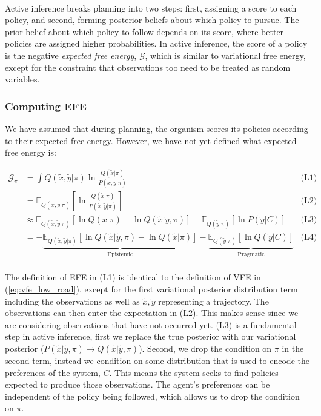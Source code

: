 \documentclass{article}
\newcommand{\refp}[1]{(\ref{#1})}
\begin{document}
\

Active inference breaks planning into two steps: first, assigning a score to each policy, and second, forming posterior beliefs about which policy to pursue. The prior belief about which policy to follow depends on its score, where better policies are assigned higher probabilities. In active inference, the score of a policy is the negative \textit{expected free energy}, $\mathcal{G}$, which is similar to variational free energy, except for the constraint that observations too need to be treated as random variables.

\subsubsection{Computing EFE}

We have assumed that during planning, the organism scores its policies according to their expected free energy. However, we have not yet defined what expected free energy is:

\begin{equation}\label{eq:efe}
	\begin{aligned}
		\mathcal{G}_\pi &= \int Q(\tilde{x}, \tilde{y} | \pi) \ln \frac{Q(\tilde{x} | \pi)}{P(\tilde{x}, \tilde{y} | \pi)} & \text{(L1)}\\ 
		&= \mathbb{E}_{Q(\tilde{x}, \tilde{y} | \pi)} \left[ \ln \frac{Q(\tilde{x} | \pi)}{P(\tilde{x}, \tilde{y} | \pi)} \right] & \text{(L2)} \\
		&\approx \mathbb{E}_{Q(\tilde{x}, \tilde{y} | \pi)} \left[ \ln Q(\tilde{x} | \pi) - \ln Q(\tilde{x} | \tilde{y}, \pi) \right] - \mathbb{E}_{Q(\tilde{y} | \pi)}\left[ \ln P(\tilde{y} | C) \right] & \text{(L3)}\\
		&= - \underbrace{\mathbb{E}_{Q(\tilde{x}, \tilde{y} | \pi)} \left[ \ln Q(\tilde{x} | \tilde{y}, \pi) - \ln Q(\tilde{x} | \pi) \right]}_{\text{Epistemic}} - \underbrace{\mathbb{E}_{Q(\tilde{y} | \pi)}\left[ \ln Q(\tilde{y} | C) \right]}_{\text{Pragmatic}} & \text{(L4)}\\ 
	\end{aligned}
\end{equation}


The definition of EFE in (L1) is identical to the definition of VFE in \refp{eq:vfe_low_road}, except for the first variational posterior distribution term including the observations as well as $\tilde{x}, \tilde{y}$ representing a trajectory. The observations can then enter the expectation in (L2). This makes sense since we are considering observations that have not occurred yet. (L3) is a fundamental step in active inference, first we replace the true posterior with our variational posterior ($P(\tilde{x} | \tilde{y}, \pi) \to Q(\tilde{x} | \tilde{y}, \pi)$). Second, we drop the condition on $\pi$ in the second term, instead we condition on some distribution that is used to encode the preferences of the system, $C$. This means the system seeks to find policies expected to produce those observations. The agent’s preferences can be independent of the policy being followed, which allows us to drop the condition on $\pi$. 
\end{document}
